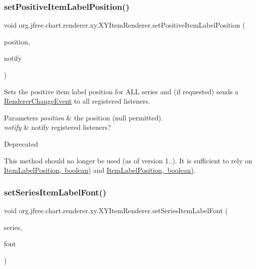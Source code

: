 \subsubsection{\texorpdfstring{set\+Positive\+Item\+Label\+Position()}{setPositiveItemLabelPosition()}\hspace{0.1cm}{\footnotesize\ttfamily [2/2]}}
{\footnotesize\ttfamily void org.\+jfree.\+chart.\+renderer.\+xy.\+X\+Y\+Item\+Renderer.\+set\+Positive\+Item\+Label\+Position (\begin{DoxyParamCaption}\item[{\mbox{\hyperlink{classorg_1_1jfree_1_1chart_1_1labels_1_1_item_label_position}{Item\+Label\+Position}}}]{position,  }\item[{boolean}]{notify }\end{DoxyParamCaption})}

Sets the positive item label position for A\+LL series and (if requested) sends a \mbox{\hyperlink{}{Renderer\+Change\+Event}} to all registered listeners.


\begin{DoxyParams}{Parameters}
{\em position} & the position ({\ttfamily null} permitted). \\
\hline
{\em notify} & notify registered listeners?\\
\hline
\end{DoxyParams}
\begin{DoxyRefDesc}{Deprecated}
\item[\mbox{\hyperlink{deprecated__deprecated000235}{Deprecated}}]This method should no longer be used (as of version 1..). It is sufficient to rely on \mbox{\hyperlink{}{Item\+Label\+Position, boolean)}} and \mbox{\hyperlink{}{Item\+Label\+Position, boolean)}}. \end{DoxyRefDesc}
\mbox{\label{interfaceorg_1_1jfree_1_1chart_1_1renderer_1_1xy_1_1_x_y_item_renderer_a4f99a8d6558ef4bcea37c2f820857b80}} 
\subsubsection{\texorpdfstring{set\+Series\+Item\+Label\+Font()}{setSeriesItemLabelFont()}}
{\footnotesize\ttfamily void org.\+jfree.\+chart.\+renderer.\+xy.\+X\+Y\+Item\+Renderer.\+set\+Series\+Item\+Label\+Font (\begin{DoxyParamCaption}\item[{int}]{series,  }\item[{Font}]{font }\end{DoxyParamCaption})}

